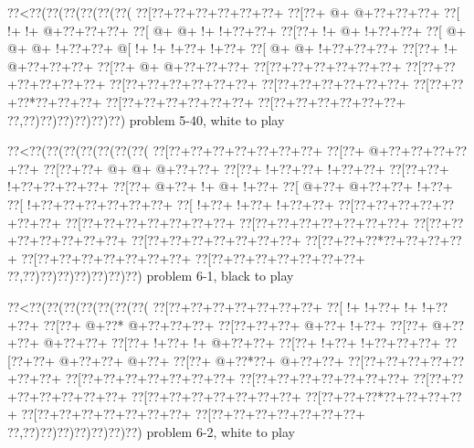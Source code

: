 \vbox{\vbox{\goo
\0??<\0??(\0??(\0??(\0??(\0??(\0??(
\0??[\0??+\0??+\0??+\0??+\0??+\0??+
\0??[\0??+\- @+\- @+\0??+\0??+\0??+
\0??[\- !+\- !+\- @+\0??+\0??+\0??+
\0??[\- @+\- @+\- !+\- !+\0??+\0??+
\0??[\0??+\- !+\- @+\- !+\0??+\0??+
\0??[\- @+\- @+\- @+\- !+\0??+\0??+
\- @[\- !+\- !+\- !+\0??+\- !+\0??+
\0??[\- @+\- @+\- !+\0??+\0??+\0??+
\0??[\0??+\- !+\- @+\0??+\0??+\0??+
\0??[\0??+\- @+\- @+\0??+\0??+\0??+
\0??[\0??+\0??+\0??+\0??+\0??+\0??+
\0??[\0??+\0??+\0??+\0??+\0??+\0??+
\0??[\0??+\0??+\0??+\0??+\0??+\0??+
\0??[\0??+\0??+\0??+\0??+\0??+\0??+
\0??[\0??+\0??+\0??*\0??+\0??+\0??+
\0??[\0??+\0??+\0??+\0??+\0??+\0??+
\0??[\0??+\0??+\0??+\0??+\0??+\0??+
\0??,\0??)\0??)\0??)\0??)\0??)\0??)
}
\hfil problem 5-40, white to play\hfil\break
}

\vbox{\vbox{\goo
\0??<\0??(\0??(\0??(\0??(\0??(\0??(\0??(
\0??[\0??+\0??+\0??+\0??+\0??+\0??+\0??+
\0??[\0??+\- @+\0??+\0??+\0??+\0??+\0??+
\0??[\0??+\0??+\- @+\- @+\- @+\0??+\0??+
\0??[\0??+\- !+\0??+\0??+\- !+\0??+\0??+
\0??[\0??+\0??+\- !+\0??+\0??+\0??+\0??+
\0??[\0??+\- @+\0??+\- !+\- @+\- !+\0??+
\0??[\- @+\0??+\- @+\0??+\0??+\- !+\0??+
\0??[\- !+\0??+\0??+\0??+\0??+\0??+\0??+
\0??[\- !+\0??+\- !+\0??+\- !+\0??+\0??+
\0??[\0??+\0??+\0??+\0??+\0??+\0??+\0??+
\0??[\0??+\0??+\0??+\0??+\0??+\0??+\0??+
\0??[\0??+\0??+\0??+\0??+\0??+\0??+\0??+
\0??[\0??+\0??+\0??+\0??+\0??+\0??+\0??+
\0??[\0??+\0??+\0??+\0??+\0??+\0??+\0??+
\0??[\0??+\0??+\0??*\0??+\0??+\0??+\0??+
\0??[\0??+\0??+\0??+\0??+\0??+\0??+\0??+
\0??[\0??+\0??+\0??+\0??+\0??+\0??+\0??+
\0??,\0??)\0??)\0??)\0??)\0??)\0??)\0??)
}
\hfil problem 6-1, black to play\hfil\break
}

\vbox{\vbox{\goo
\0??<\0??(\0??(\0??(\0??(\0??(\0??(\0??(
\0??[\0??+\0??+\0??+\0??+\0??+\0??+\0??+
\0??[\- !+\- !+\0??+\- !+\- !+\0??+\0??+
\0??[\0??+\- @+\0??*\- @+\0??+\0??+\0??+
\0??[\0??+\0??+\0??+\- @+\0??+\- !+\0??+
\0??[\0??+\- @+\0??+\0??+\- @+\0??+\0??+
\0??[\0??+\- !+\0??+\- !+\- @+\0??+\0??+
\0??[\0??+\- !+\0??+\- !+\0??+\0??+\0??+
\0??[\0??+\0??+\- @+\0??+\0??+\- @+\0??+
\0??[\0??+\- @+\0??*\0??+\- @+\0??+\0??+
\0??[\0??+\0??+\0??+\0??+\0??+\0??+\0??+
\0??[\0??+\0??+\0??+\0??+\0??+\0??+\0??+
\0??[\0??+\0??+\0??+\0??+\0??+\0??+\0??+
\0??[\0??+\0??+\0??+\0??+\0??+\0??+\0??+
\0??[\0??+\0??+\0??+\0??+\0??+\0??+\0??+
\0??[\0??+\0??+\0??*\0??+\0??+\0??+\0??+
\0??[\0??+\0??+\0??+\0??+\0??+\0??+\0??+
\0??[\0??+\0??+\0??+\0??+\0??+\0??+\0??+
\0??,\0??)\0??)\0??)\0??)\0??)\0??)\0??)
}
\hfil problem 6-2, white to play\hfil\break
}

